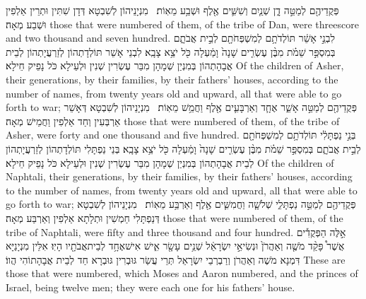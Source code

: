 {פְּקֻדֵיהֶ֖ם לְמַטֵּ֣ה דָ֑ן שְׁנַ֧יִם וְשִׁשִּׁ֛ים אֶ֖לֶף וּשְׁבַ֥ע מֵאֽוֹת׃ \petucha }
{מִנְיָנֵיהוֹן לְשִׁבְטָא דְּדָן שִׁתִּין וּתְרֵין אַלְפִין וּשְׁבַע מְאָה׃}
{those that were numbered of them, of the tribe of Dan, were threescore and two thousand and seven hundred.}{}
{לִבְנֵ֣י אָשֵׁ֔ר תּוֹלְדֹתָ֥ם לְמִשְׁפְּחֹתָ֖ם לְבֵ֣ית אֲבֹתָ֑ם בְּמִסְפַּ֣ר שֵׁמֹ֗ת מִבֶּ֨ן עֶשְׂרִ֤ים שָׁנָה֙ וָמַ֔עְלָה כֹּ֖ל יֹצֵ֥א צָבָֽא׃}
{לִבְנֵי אָשֵׁר תּוֹלְדָתְהוֹן לְזַרְעֲיָתְהוֹן לְבֵית אֲבָהָתְהוֹן בְּמִנְיַן שְׁמָהָן מִבַּר עֶשְׂרִין שְׁנִין וּלְעֵילָא כֹּל נָפֵיק חֵילָא׃}
{Of the children of Asher, their generations, by their families, by their fathers’ houses, according to the number of names, from twenty years old and upward, all that were able to go forth to war;}{}
{פְּקֻדֵיהֶ֖ם לְמַטֵּ֣ה אָשֵׁ֑ר אֶחָ֧ד וְאַרְבָּעִ֛ים אֶ֖לֶף וַחֲמֵ֥שׁ מֵאֽוֹת׃ \petucha }
{מִנְיָנֵיהוֹן לְשִׁבְטָא דְּאָשֵׁר אַרְבְּעִין וְחַד אַלְפִין וַחֲמֵישׁ מְאָה׃}
{those that were numbered of them, of the tribe of Asher, were forty and one thousand and five hundred.}{}
{בְּנֵ֣י נַפְתָּלִ֔י תּוֹלְדֹתָ֥ם לְמִשְׁפְּחֹתָ֖ם לְבֵ֣ית אֲבֹתָ֑ם בְּמִסְפַּ֣ר שֵׁמֹ֗ת מִבֶּ֨ן עֶשְׂרִ֤ים שָׁנָה֙ וָמַ֔עְלָה כֹּ֖ל יֹצֵ֥א צָבָֽא׃}
{בְּנֵי נַפְתָּלִי תּוֹלְדָתְהוֹן לְזַרְעֲיָתְהוֹן לְבֵית אֲבָהָתְהוֹן בְּמִנְיַן שְׁמָהָן מִבַּר עֶשְׂרִין שְׁנִין וּלְעֵילָא כֹּל נָפֵיק חֵילָא׃}
{Of the children of Naphtali, their generations, by their families, by their fathers’ houses, according to the number of names, from twenty years old and upward, all that were able to go forth to war;}{}
{פְּקֻדֵיהֶ֖ם לְמַטֵּ֣ה נַפְתָּלִ֑י שְׁלֹשָׁ֧ה וַחֲמִשִּׁ֛ים אֶ֖לֶף וְאַרְבַּ֥ע מֵאֽוֹת׃ \petucha }
{מִנְיָנֵיהוֹן לְשִׁבְטָא דְּנַפְתָּלִי חַמְשִׁין וּתְלָתָא אַלְפִין וְאַרְבַּע מְאָה׃}
{those that were numbered of them, of the tribe of Naphtali, were fifty and three thousand and four hundred.}{}
{אֵ֣לֶּה הַפְּקֻדִ֡ים אֲשֶׁר֩ פָּקַ֨ד מֹשֶׁ֤ה וְאַהֲרֹן֙ וּנְשִׂיאֵ֣י יִשְׂרָאֵ֔ל שְׁנֵ֥ים עָשָׂ֖ר אִ֑ישׁ אִישׁ\maqqaf אֶחָ֥ד לְבֵית\maqqaf אֲבֹתָ֖יו הָיֽוּ׃}
{אִלֵּין מִנְיָנַיָּא דִּמְנָא מֹשֶׁה וְאַהֲרֹן וְרַבְרְבֵי יִשְׂרָאֵל תְּרֵי עֲשַׂר גּוּבְרִין גּוּבְרָא חַד לְבֵית אֲבָהָתוֹהִי הֲווֹ׃}
{These are those that were numbered, which Moses and Aaron numbered, and the princes of Israel, being twelve men; they were each one for his fathers’ house.}{}
